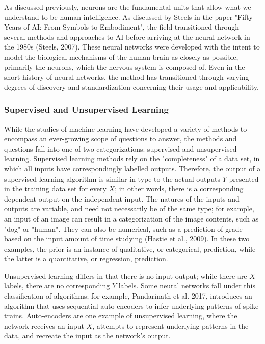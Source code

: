 \documentclass[11pt]{article}
\begin{document}
As discussed previously, neurons are the fundamental units that allow what we understand to be human intelligence. As discussed by Steels in the paper "Fifty Years of AI: From Symbols to Embodiment", the field transitioned through several methods and approaches to AI before arriving at the neural network in the 1980s (Steels, 2007). These neural networks were developed with the intent to model the biological mechanisms of the human brain as closely as possible, primarily the neurons, which the nervous system is composed of. Even in the short history of neural networks, the method has transitioned through varying degrees of discovery and standardization concerning their usage and applicability.\par

\subsubsection{Supervised and Unsupervised Learning}
While the studies of machine learning have developed a variety of methods to encompass an ever-growing scope of questions to answer, the methods and questions fall into one of two categorizations: supervised and unsupervised learning. Supervised learning methods rely on the "completeness" of a data set, in which all inputs have correspondingly labelled outputs. Therefore, the output of a supervised learning algorithm is similar in type to the actual outputs $Y$ presented in the training data set for every $X$; in other words, there is a corresponding dependent output on the independent input. The natures of the inputs and outputs are variable, and need not necessarily be of the same type; for example, an input of an image can result in a categorization of the image contents, such as "dog" or "human". They can also be numerical, such as a prediction of grade based on the input amount of time studying (Hastie et al., 2009). In these two examples, the prior is an instance of qualitative, or categorical, prediction, while the latter is a quantitative, or regression, prediction.\par

Unsupervised learning differs in that there is no input-output; while there are $X$ labels, there are no corresponding $Y$ labels. Some neural networks fall under this classification of algorithms; for example, Pandarinath et al. 2017, introduces an algorithm that uses sequential auto-encoders to infer underlying patterns of spike trains. Auto-encoders are one example of unsupervised learning, where the network receives an input $X$, attempts to represent underlying patterns in the data, and recreate the input as the network's output. 
\end{document}
